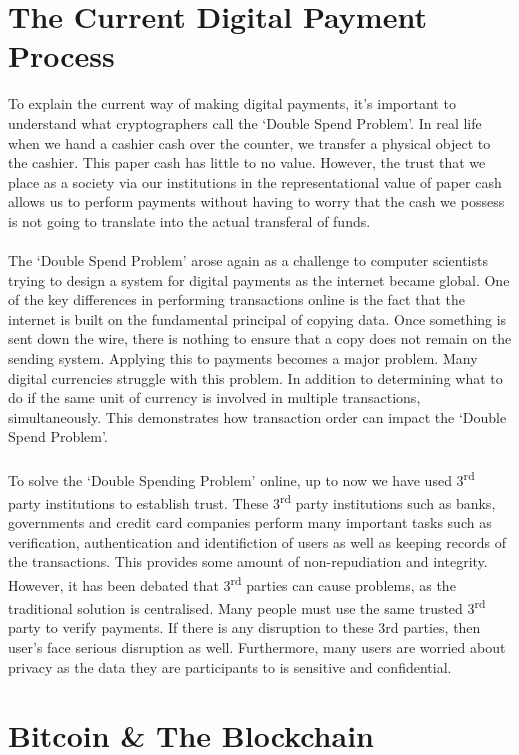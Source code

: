 \documentclass[10pt, a4paper]{report}
\begin{document}
\section*{The Current Digital Payment Process}
To explain the current way of making digital payments, it's
important to understand what cryptographers call the `Double Spend Problem'.
In real life when we hand a cashier cash over the counter, we transfer a physical
object to the cashier. This paper cash has little to no value. However, the trust
that we place as a society via our institutions in the representational value of paper
cash allows us to perform payments without having to worry that the cash we possess
is not going to translate into the actual transferal of funds.
\\\\
The `Double Spend Problem' arose again as a challenge to computer scientists trying
to design a system for digital payments as the internet became global.
One of the key differences in performing transactions online is the fact that
the internet is built on the fundamental principal of copying data.
Once something is sent down the wire, there is nothing to ensure that a
copy does not remain on the sending system. Applying this to payments
becomes a major problem. Many digital currencies struggle with this problem.
In addition to determining what to do if the same unit of currency is involved
in multiple transactions, simultaneously. This demonstrates how transaction
order can impact the `Double Spend Problem'.
\\\\
To solve the `Double Spending Problem' online, up to now we have used
3\textsuperscript{rd} party institutions to establish trust. These 3\textsuperscript{rd}
party institutions such as banks, governments and credit card companies perform many
important tasks such as verification, authentication and identifiction of users as well as
keeping records of the transactions. This provides some amount of non-repudiation
and integrity. However, it has been debated that 3\textsuperscript{rd} parties can cause problems,
as the traditional solution is centralised. Many people must use the same trusted 3\textsuperscript{rd} party to verify payments.
If there is any disruption to these 3rd parties, then user's face serious disruption as well.
Furthermore, many users are worried about privacy as the data they are participants to is
sensitive and confidential.

\section*{Bitcoin \& The Blockchain}
\end{document}
